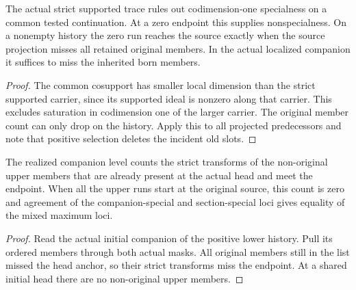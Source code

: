 \begin{theorem}
\label{hir:g1-companion-zero-branch-recognition}
\leanok
The actual strict supported trace rules out codimension-one
specialness on a common tested continuation. At a zero endpoint
this supplies nonspecialness. On a nonempty history the zero
run reaches the source exactly when the source projection
misses all retained original members. In the actual localized
companion it suffices to miss the inherited born members.
\end{theorem}
\begin{proof}
The common cosupport has smaller local dimension than the
strict supported carrier, since its supported ideal is nonzero
along that carrier. This excludes saturation in codimension
one of the larger carrier. The original member count can only
drop on the history. Apply this to all projected predecessors
and note that positive selection deletes the incident old slots.
\end{proof}

\begin{theorem}
\label{hir:g1-later-mixed-upper-born-trace}
\leanok
The realized companion level counts the strict transforms
of the non-original upper members that are already present
at the actual head and meet the endpoint. When all the upper
runs start at the original source, this count is zero and
agreement of the companion-special and section-special loci
gives equality of the mixed maximum loci.
\end{theorem}
\begin{proof}
Read the actual initial companion of the positive lower
history. Pull its ordered members through both actual masks.
All original members still in the list missed the head
anchor, so their strict transforms miss the endpoint. At a
shared initial head there are no non-original upper members.
\end{proof}

